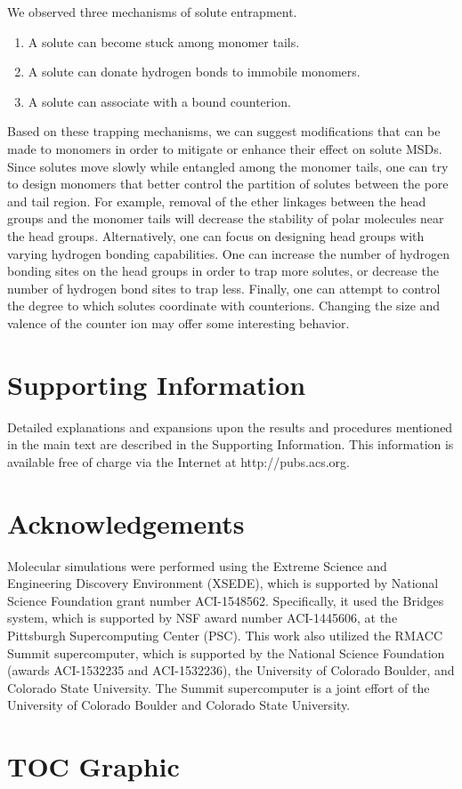 \documentclass[journal=jpcbfk,manuscript=article]{achemso}
\begin{document}
  We observed three mechanisms of solute entrapment.
  \begin{enumerate}
    \item A solute can become stuck among monomer tails. 
    \item A solute can donate hydrogen bonds to immobile monomers.
    \item A solute can associate with a bound counterion.
  \end{enumerate}
  
  Based on these trapping mechanisms, we can suggest modifications that
  can be made to monomers in order to mitigate or enhance their effect on
  solute MSDs. Since solutes move slowly while entangled among the monomer
  tails, one can try to design monomers that better control the partition
  of solutes between the pore and tail region. For example, removal of the 
  ether linkages between the head groups and the monomer tails will decrease
  the stability of polar molecules near the head groups. Alternatively, one
  can focus on designing head groups with varying hydrogen bonding capabilities.
  One can increase the number of hydrogen bonding sites on the head groups
  in order to trap more solutes, or decrease the number of hydrogen bond sites
  to trap less. Finally, one can attempt to control the degree to which solutes
  coordinate with counterions. Changing the size and valence of the counter 
  ion may offer some interesting behavior. 
 
 
  \section{Supporting Information}

  Detailed explanations and expansions upon the results and procedures mentioned in
  the main text are described in the Supporting Information. This information is
  available free of charge via the Internet at http://pubs.acs.org.

  \section{Acknowledgements}

  Molecular simulations were performed using the Extreme Science and
  Engineering Discovery Environment (XSEDE), which is supported by National
  Science Foundation grant number ACI-1548562. Specifically, it used the Bridges
  system, which is supported by NSF award number ACI-1445606, at the Pittsburgh
  Supercomputing Center (PSC). This work also utilized the RMACC Summit supercomputer,
  which is supported by the National Science Foundation (awards ACI-1532235 and
  ACI-1532236), the University of Colorado Boulder, and Colorado State
  University. The Summit supercomputer is a joint effort of the University of
  Colorado Boulder and Colorado State University.

  \clearpage

  
  

  \newpage

  \section{TOC Graphic}
\end{document}
